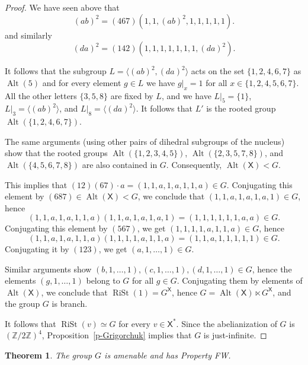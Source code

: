 \documentclass[11pt]{amsart}
\newcommand{\Z}{\ensuremath{\mathbb{Z}}}%
\newcommand{\xs}{\alb^\ast}
\newcommand{\Alt}{\mathop{\mathrm{Alt}}\nolimits}
\newcommand{\rist}{\ensuremath{\operatorname{RiSt}}}%
\newcommand{\alb}{\ensuremath{\mathsf{X}}}%
\theoremstyle{definition}
\theoremstyle{plain}
\newtheorem{thm}[defin]{Theorem}
\newtheorem{main thm}{Theorem}
\theoremstyle{remark}
\theoremstyle{plain}
\begin{document}
\begin{proof}
We have seen above that 
\[
    (ab)^2=(467)(1, 1, (ab)^2, 1, 1, 1, 1, 1).
\]
and similarly
\[(da)^2=(142)(1, 1, 1, 1, 1, 1, 1, (da)^2).\]

It follows that the subgroup $L=\langle (ab)^2, (da)^2\rangle$ acts on the set $\{1, 2, 4, 6, 7\}$ as $\Alt(5)$ and for every element $g\in L$ we have $g|_x=1$ for all $x\in\{1, 2, 4, 5, 6, 7\}$. All the other letters $\{3, 5, 8\}$ are fixed by $L$, and we have $L|_5=\{1\}$, $L|_3=\langle (ab)^2\rangle$, and $L|_8=\langle (da)^2\rangle$. It follows that $L'$ is the rooted group $\Alt(\{1, 2, 4, 6, 7\})$.

The same arguments (using other pairs of dihedral subgroups of the nucleus) show that the rooted groups $\Alt(\{1, 2, 3, 4, 5\})$, $\Alt(\{2, 3, 5, 7, 8\})$, and $\Alt(\{4, 5, 6, 7, 8\})$ are also contained in $G$. Consequently, $\Alt(\alb)<G$. 

This implies that $(12)(67)\cdot a=(1, 1, a, 1, a, 1, 1, a)\in G$. Conjugating this element by $(687)\in\Alt(\alb)<G$, we conclude that $(1, 1, a, 1, a, 1, a, 1)\in G$, hence 
\[(1, 1, a, 1, a, 1, 1, a)(1, 1, a, 1, a, 1, a, 1)=(1, 1, 1, 1, 1, 1, a, a)\in G.\]
Conjugating this element by $(567)$, we get $(1, 1, 1, 1, a, 1, 1, a)\in G$, hence 
\[(1, 1, a, 1, a, 1, 1, a)(1, 1, 1, 1, a, 1, 1, a)=(1, 1, a, 1, 1, 1, 1, 1)\in G.\]
Conjugating it by $(123)$, we get $(a, 1, \ldots, 1)\in G$.

Similar arguments show $(b, 1, \ldots, 1), (c, 1, \ldots, 1), (d, 1, \ldots, 1)\in G$, hence the elements $(g, 1, \ldots, 1)$ belong to $G$ for all $g\in G$. Conjugating them by elements of $\Alt(\alb)$, we conclude that $\rist(1)=G^{\alb}$, hence $G=\Alt(\alb)\ltimes G^{\alb}$, and the group $G$ is branch.

It follows that $\rist(v)\simeq G$ for every $v\in \xs$. Since the abelianization of $G$ is $(\Z/2\Z)^4$, Proposition~\ref{p-Grigorchuk} implies that $G$ is just-infinite.
\end{proof}

\begin{thm}\label{t-sierpinski}
The group $G$ is amenable and has Property FW.
\end{thm}
\end{document}
